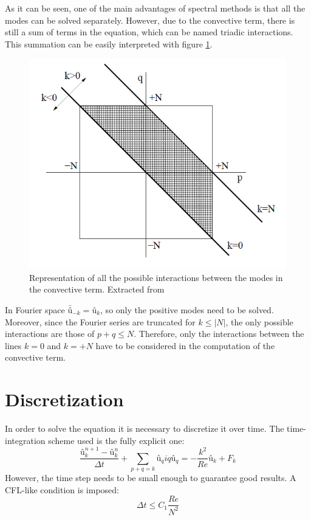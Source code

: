 As it can be seen, one of the main advantages of spectral methods is that all the modes can be solved separately. However, due to the convective term, there is still a sum of terms in the equation, which can be named triadic interactions. This summation can be easily interpreted with figure \ref{TriadicFigure}.
\begin{figure}
	\centering
	\includegraphics[scale=0.7]{Burgers/Burger}
	\caption[Representation of all the possible interactions between the modes in the convective term]{Representation of all the possible interactions between the modes in the convective term. Extracted from \cite{CTTC2014}}
	\label{TriadicFigure}
\end{figure}
In Fourier space $\bar{û}_{-k}=û_{k}$, so only the positive modes need to be solved. Moreover, since the Fourier series are truncated for $k\leq|N|$, the only possible interactions are those of $p+q\leq N$. Therefore, only the interactions between the lines $k=0$ and $k=+N$ have to be considered in the computation of the convective term.

\section{Discretization}
In order to solve the equation it is necessary to discretize it over time. The time-integration scheme used is the fully explicit one:
\begin{equation}
\frac{û_{k}^{n+1}-û_{k}^{n}}{\Delta t}+\sum_{p+q=k}û_{q}iqû_{q}=-\frac{k^{2}}{Re}û_{k}+F_{k}
\end{equation}
However, the time step needs to be small enough to guarantee good results. A CFL-like condition is imposed:
\begin{equation}
\Delta t\leq C_{1}\frac{Re}{N^{2}}
\end{equation}

